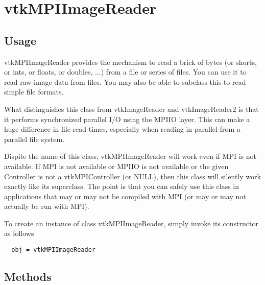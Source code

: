 \section{vtkMPIImageReader}

\subsection{Usage}


 vtkMPIImageReader provides the mechanism to read a brick of bytes (or shorts,
 or ints, or floats, or doubles, ...) from a file or series of files.  You can
 use it to read raw image data from files.  You may also be able to subclass
 this to read simple file formats.

 What distinguishes this class from vtkImageReader and vtkImageReader2 is that
 it performs synchronized parallel I/O using the MPIIO layer.  This can make a
 huge difference in file read times, especially when reading in parallel from
 a parallel file system.

 Dispite the name of this class, vtkMPIImageReader will work even if MPI is
 not available.  If MPI is not available or MPIIO is not available or the
 given Controller is not a vtkMPIController (or NULL), then this class will
 silently work exactly like its superclass.  The point is that you can safely
 use this class in applications that may or may not be compiled with MPI (or
 may or may not actually be run with MPI).


To create an instance of class vtkMPIImageReader, simply
invoke its constructor as follows
\begin{verbatim}
  obj = vtkMPIImageReader
\end{verbatim}
\subsection{Methods}

